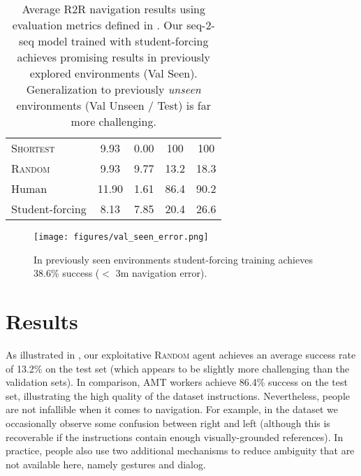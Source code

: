 \documentclass[10pt,twocolumn,letterpaper]{article}
\begin{document}
\begin{table}[]
\begin{center}
\begin{tabular}{lcccc}
			\textsc{Shortest}      &         9.93                  &       0.00                   &     100             &       100           \\
			\textsc{Random}      &         9.93                  &      9.77                    &      13.2            &      18.3            \\
			Human      &          11.90                 &            1.61              &       86.4           &        90.2         \\
			Student-forcing            &         8.13                 &      7.85                   &  20.4   &         26.6         \\       
			\midrule
		\end{tabular}
	\end{center}
	\caption{Average R2R navigation results using evaluation metrics defined in . Our seq-2-seq model trained with student-forcing achieves promising results in previously explored environments (Val Seen). Generalization to previously \textit{unseen} environments (Val Unseen / Test) is far more challenging. }
	\label{tab:results}
\end{table}


\begin{figure}[t]
	\begin{center}
		\texttt{[image: figures/val\_seen\_error.png]}
	\end{center}
	\caption{In previously seen environments student-forcing training achieves 38.6\% success ($<$ 3m navigation error). }
	\label{fig:nav-error}
\end{figure}



\section{Results}
\label{sec:results}

As illustrated in , our exploitative \textsc{Random} agent achieves an average success rate of 13.2\% on the test set (which appears to be slightly more challenging than the validation sets). In comparison, AMT workers achieve 86.4\% success on the test set, illustrating the high quality of the dataset instructions. Nevertheless, people are not infallible when it comes to navigation. For example, in the dataset we occasionally observe some confusion between right and left (although this is recoverable if the instructions contain enough visually-grounded references). In practice, people also use two additional mechanisms to reduce ambiguity that are not available here, namely gestures and dialog.
\end{document}
